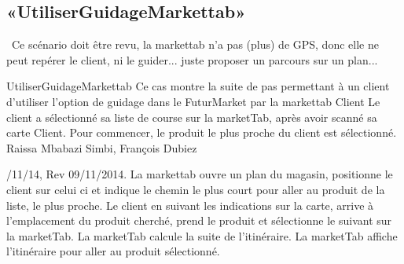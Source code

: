 \subsection{«UtiliserGuidageMarkettab»}
\TODO\ Ce scénario doit être revu, la markettab n'a pas (plus) de GPS, donc elle ne peut repérer le client, ni le guider... juste proposer un parcours sur un plan...

\startCU
\nom UtiliserGuidageMarkettab
\but Ce cas montre la suite de pas permettant à un client d'utiliser l'option de guidage dans le FuturMarket par la markettab
\acteur Client
\precondition Le client a sélectionné sa liste de course sur la marketTab, après avoir scanné sa carte Client. Pour commencer, le produit le plus proche du client est sélectionné.
\auteur Raissa Mbabazi Simbi, François Dubiez
\date 7/11/14, Rev 09/11/2014.
\nominal %
\startnominal
\etape[UGM:SA1] La markettab ouvre un plan du magasin, positionne le client sur celui ci et indique le chemin le plus court pour aller au produit de la liste, le plus proche.
 Le client en suivant les indications sur la carte, arrive à l'emplacement du produit cherché, prend le produit et sélectionne le suivant sur la marketTab.
\etape La marketTab calcule la suite de l'itinéraire.
\stopnominal
\postcondition La marketTab affiche l'itinéraire pour aller au produit sélectionné.

